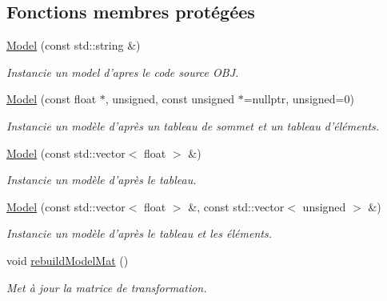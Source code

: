 \subsection*{Fonctions membres protégées}
\begin{DoxyCompactItemize}
\item 
\hyperlink{classModel_a83f93ebbe04926f639fbedbf78a7c760}{Model} (const std\+::string \&)
\begin{DoxyCompactList}\small\item\em Instancie un model d'apres le code source O\+B\+J. \end{DoxyCompactList}\item 
\hyperlink{classModel_a15d7d92731e90feee6e2d68dca9cf8a1}{Model} (const float $\ast$, unsigned, const unsigned $\ast$=nullptr, unsigned=0)
\begin{DoxyCompactList}\small\item\em Instancie un modèle d'après un tableau de sommet et un tableau d'éléments. \end{DoxyCompactList}\item 
\hyperlink{classModel_a6401b781378ee497f3862139948b91d4}{Model} (const std\+::vector$<$ float $>$ \&)
\begin{DoxyCompactList}\small\item\em Instancie un modèle d'après le tableau. \end{DoxyCompactList}\item 
\hyperlink{classModel_a820453a93d6e36c9d79ef370650e0988}{Model} (const std\+::vector$<$ float $>$ \&, const std\+::vector$<$ unsigned $>$ \&)
\begin{DoxyCompactList}\small\item\em Instancie un modèle d'après le tableau et les éléments. \end{DoxyCompactList}\item 
void \hyperlink{classModel_a8b977a20040024b1f04c9badcc177391}{rebuild\+Model\+Mat} ()
\begin{DoxyCompactList}\small\item\em Met à jour la matrice de transformation. \end{DoxyCompactList}\end{DoxyCompactItemize}

